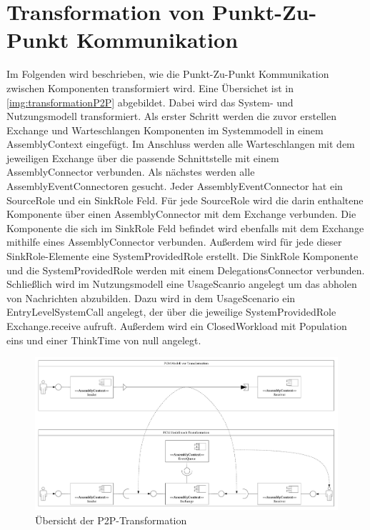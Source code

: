 \section{Transformation von Punkt-Zu-Punkt Kommunikation}
Im Folgenden wird beschrieben, wie die Punkt-Zu-Punkt Kommunikation zwischen Komponenten transformiert wird. Eine Übersichet ist in \autoref{img:transformationP2P} abgebildet. Dabei wird das System- und Nutzungsmodell transformiert. Als erster Schritt werden die zuvor erstellen Exchange und Warteschlangen Komponenten im Systemmodell in einem AssemblyContext eingefügt. Im Anschluss werden alle Warteschlangen mit dem jeweiligen Exchange über die passende Schnittstelle mit einem AssemblyConnector verbunden. Als nächstes werden alle AssemblyEventConnectoren gesucht. Jeder AssemblyEventConnector hat ein SourceRole und ein SinkRole Feld. Für jede SourceRole wird die darin enthaltene Komponente über einen AssemblyConnector mit dem Exchange verbunden. Die Komponente die sich im SinkRole Feld befindet wird ebenfalls mit dem Exchange mithilfe eines AssemblyConnector verbunden. Außerdem wird für jede dieser SinkRole-Elemente eine SystemProvidedRole erstellt. Die SinkRole Komponente und die SystemProvidedRole werden mit einem DelegationsConnector verbunden. Schließlich wird im Nutzungsmodell eine UsageScanrio angelegt um das abholen von Nachrichten abzubilden. Dazu wird in dem UsageScenario ein EntryLevelSystemCall angelegt, der über die jeweilige SystemProvidedRole Exchange.receive aufruft. Außerdem wird ein ClosedWorkload mit Population eins und einer ThinkTime von null angelegt.

\begin{figure}
\center
  \includegraphics[width=1\textwidth]{images/transformation/transformationSystemP2P.pdf}
  \caption{Übersicht der P2P-Transformation}
  \label{img:transformationP2P}
\end{figure}

